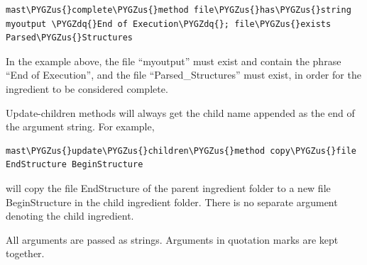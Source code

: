 \documentclass[letterpaper,10pt,english]{sphinxmanual}
\def\PYGZus{\char`\_}
\def\PYGZdq{\char`\"}
\begin{document}
\begin{Verbatim}[commandchars=\\\{\}]
mast\PYGZus{}complete\PYGZus{}method file\PYGZus{}has\PYGZus{}string myoutput \PYGZdq{}End of Execution\PYGZdq{}; file\PYGZus{}exists Parsed\PYGZus{}Structures
\end{Verbatim}

In the example above, the file ``myoutput'' must exist and contain the phrase ``End of Execution'', and the file ``Parsed\_Structures'' must exist, in order for the ingredient to be considered complete.

Update-children methods will always get the child name appended as the end of the argument string. For example,

\begin{Verbatim}[commandchars=\\\{\}]
mast\PYGZus{}update\PYGZus{}children\PYGZus{}method copy\PYGZus{}file EndStructure BeginStructure
\end{Verbatim}

will copy the file EndStructure of the parent ingredient folder to a new file BeginStructure in the child ingredient folder. There is no separate argument denoting the child ingredient.

All arguments are passed as strings. Arguments in quotation marks are kept together.
\end{document}
